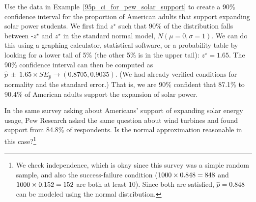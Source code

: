 \begin{example}{Use the data in
    Example~\ref{95p_ci_for_pew_solar_support} to
    create a 90\% confidence interval for the proportion of American
    adults that support expanding solar power students.}
  We first find $z^{\star}$ such that 90\% of the distribution falls
  between -$z^{\star}$ and $z^{\star}$ in the standard normal model,
  $N(\mu=0, \sigma=1)$. We can do this using a graphing calculator,
  statistical software, or a probability table by looking for a lower
  tail of 5\% (the other 5\% is in the upper tail): $z^{\star}=1.65$.
  The 90\% confidence interval can then be computed as
  $\hat{p}\ \pm\ 1.65\times SE_{\hat{p}} \to (0.8705, 0.9035)$.
  (We had already verified conditions for normality and the standard error.)
  That is, we are 90\% confident that 87.1\% to 90.4\% of American
  adults support the expansion of solar power.
\end{example}

\newcommand{\pewwindpollsize}{\pewsolarpollsize}
\newcommand{\pewwindpollprop}{0.848}
\newcommand{\pewwindpollpropcomplement}{0.152}
\newcommand{\pewwindpollpercent}{84.8}
\newcommand{\pewwindpollpercentcomplement}{15.2}
\newcommand{\pewwindpollcount}{848}
\newcommand{\pewwindpollcountcomplement}{152}
\newcommand{\pewwindpollse}{0.0114}

\begin{exercise}\label{pew_wind_turbine_support_normal_dist_gp}
In the same survey asking about Americans' support of expanding solar energy usage, Pew Research asked the same question about wind turbines and found support from \pewwindpollpercent{}\% of respondents. Is the normal approximation reasonable in this case?\footnote{We check independence, which is okay since this survey was a simple random sample, and also the success-failure condition ($\pewwindpollsize{} \times \pewwindpollprop{} = \pewwindpollcount{}$ and $\pewwindpollsize{} \times \pewwindpollpropcomplement{} = \pewwindpollcountcomplement$ are both at least 10). Since both are satisfied, $\hat{p} = \pewwindpollprop{}$ can be modeled using the normal distribution.}
\end{exercise}

